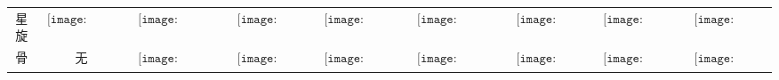 \begin{longtable}{|c|cccccccc|}
星旋&$\begin{array}{c}\texttt{[image: figures/Vortex\_Candle.png]}\end{array}$&$\begin{array}{c}\texttt{[image: figures/Vortex\_Candelabra.png]}\end{array}$&$\begin{array}{c}\texttt{[image: figures/Vortex\_Lamp.png]}\end{array}$&$\begin{array}{c}\texttt{[image: figures/Vortex\_Lantern.png]}\end{array}$&$\begin{array}{c}\texttt{[image: figures/Vortex\_Chandelier.png]}\end{array}$&$\begin{array}{c}\texttt{[image: figures/Vortex\_Door.png]}\end{array}$&$\begin{array}{c}\texttt{[image: figures/Vortex\_Toilet.png]}\end{array}$&$\begin{array}{c}\texttt{[image: figures/Vortex\_Chest.png]}\end{array}$\\
骨&无&$\begin{array}{c}\texttt{[image: figures/Bone\_Candelabra.png]}\end{array}$&$\begin{array}{c}\texttt{[image: figures/Bone\_Lamp.png]}\end{array}$&$\begin{array}{c}\texttt{[image: figures/Bone\_Lantern.png]}\end{array}$&$\begin{array}{c}\texttt{[image: figures/Bone\_Chandelier.png]}\end{array}$&$\begin{array}{c}\texttt{[image: figures/Bone\_Door.png]}\end{array}$&$\begin{array}{c}\texttt{[image: figures/Bone\_Toilet.png]}\end{array}$&$\begin{array}{c}\texttt{[image: figures/Bone\_Chest.png]}\end{array}$\\

\end{longtable}
